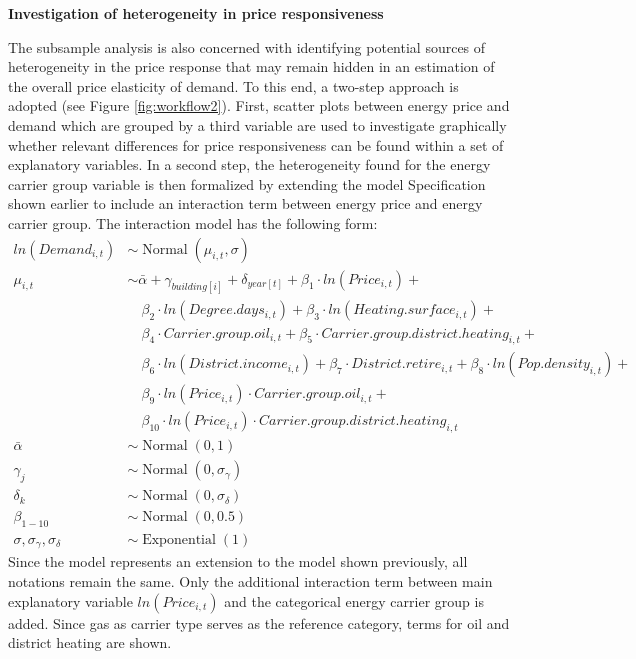 \documentclass[12pt,twoside]{reedthesis}
\begin{document}
\textbf{Investigation of heterogeneity in price responsiveness}

The subsample analysis is also concerned with identifying potential sources of heterogeneity in the price response that may remain hidden in an estimation of the overall price elasticity of demand. To this end, a two-step approach is adopted (see Figure \ref{fig:workflow2}). First, scatter plots between energy price and demand which are grouped by a third variable are used to investigate graphically whether relevant differences for price responsiveness can be found within a set of explanatory variables. In a second step, the heterogeneity found for the energy carrier group variable is then formalized by extending the model Specification shown earlier to include an interaction term between energy price and energy carrier group. The interaction model has the following form:
\begin{align*}
ln(Demand_{i,t}) & \sim \operatorname{Normal}(\mu_{i,t}, \sigma) \\
\mu_{i,t} & \sim \bar\alpha + \gamma_{building[i]} + \delta_{year[t]} + \beta_1 \cdot ln(Price_{i,t}) +  \\
 & \quad \beta_{2} \cdot ln(Degree.days_{i,t}) + \beta_{3} \cdot ln(Heating.surface_{i,t}) + \\
 & \quad \beta_{4} \cdot Carrier.group.oil_{i,t} + \beta_{5} \cdot Carrier.group.district.heating_{i,t} + \\
 & \quad \beta_{6} \cdot ln(District.income_{i,t}) + \beta_{7} \cdot District.retire_{i,t} + \beta_{8} \cdot ln(Pop.density_{i,t}) + \\
 & \quad \beta_{9} \cdot ln(Price_{i,t}) \cdot Carrier.group.oil_{i,t} + \\
 & \quad \beta_{10} \cdot ln(Price_{i,t}) \cdot Carrier.group.district.heating_{i,t} \\
\bar\alpha & \sim \operatorname{Normal}(0, 1) \\
\gamma_j & \sim \operatorname{Normal}(0, \sigma_{\gamma}) \\
\delta_k & \sim \operatorname{Normal}(0, \sigma_{\delta}) \\
\beta_{1-10} & \sim \operatorname{Normal}(0, 0.5) \\
\sigma, \sigma_{\gamma}, \sigma_{\delta} & \sim \operatorname{Exponential}(1)
\end{align*}
Since the model represents an extension to the model shown previously, all notations remain the same. Only the additional interaction term between main explanatory variable \(ln(Price_{i,t})\) and the categorical energy carrier group is added. Since gas as carrier type serves as the reference category, terms for oil and district heating are shown.
\end{document}

